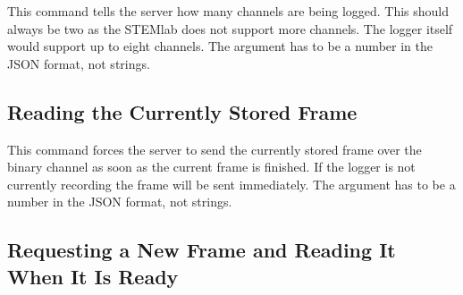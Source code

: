 This command tells the server how  many channels are being logged. This should
always be two as the STEMlab does not support more channels. The logger itself
would support up  to eight channels.  The  argument has to be a  number in the
JSON format, not strings.


\subsection{Reading the Currently Stored Frame} %
\label{subsec:devguide:server:currently_stored_frame}

This command  forces the server  to send the  currently stored frame  over the
binary channel as soon as the current  frame is finished. If the logger is not
currently recording  the frame will  be sent immediately.   The 
argument has to be a number in the JSON format, not strings.


\subsection{Requesting a New Frame and Reading It When It Is Ready} %
\label{subsec:devguide:server:request_new_frame}

